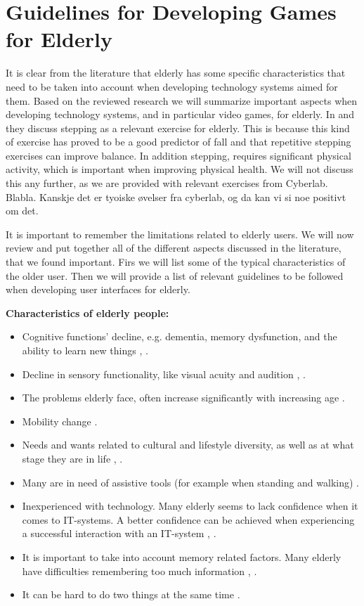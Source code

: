 \section{Guidelines for Developing Games for Elderly}
It is clear from the literature that elderly has some specific characteristics that need to be taken into account when developing technology systems aimed for them. Based on the reviewed research we will summarize important aspects when developing technology systems, and in particular video games, for elderly. In \cite{bruin} and \cite{gerling2} they discuss stepping as a relevant exercise for elderly. This is because this kind of exercise has proved to be a good predictor of fall and that repetitive stepping exercises can improve balance. In addition stepping, requires significant physical activity, which is important when improving physical health. We will not discuss this any further, as we are provided with relevant exercises from Cyberlab. Blabla. Kanskje det er tyoiske øvelser fra cyberlab, og da kan vi si noe positivt om det.

It is important to remember the limitations related to elderly users. We will now review and put together all of the different aspects discussed in the literature, that we found important. Firs we will list some of the typical characteristics of the older user. Then we will provide a list of relevant guidelines to be followed when developing user interfaces for elderly. 

\textbf{Characteristics of elderly people:}
\begin{itemize}
\renewcommand{\labelitemi}{$\bullet$}
\item Cognitive functions' decline, e.g. dementia, memory dysfunction, and the ability to learn new things \cite{Billis}, \cite{gregor}.
\item Decline in sensory functionality, like  visual acuity and audition \cite{Billis}, \cite{gregor}.
\item The problems elderly face, often increase significantly with increasing age \cite{gregor}.
\item Mobility change \cite{Billis}.
\item Needs and wants related to cultural and lifestyle diversity, as well as at what stage they are in life \cite{Billis}, \cite{gregor}.
\item Many are in need of assistive tools (for example when standing and walking) \cite{gregor}.
\item Inexperienced with technology. Many elderly seems to lack confidence when it comes to IT-systems. A better confidence can be achieved when experiencing a successful interaction with an IT-system \cite{Billis}, \cite{gregor}.
\item It is important to take into account memory related factors. Many elderly have difficulties remembering too much information \cite{Billis}, \cite{gregor}.
\item It can be hard to do two things at the same time \cite{bruin}.
\end{itemize}

